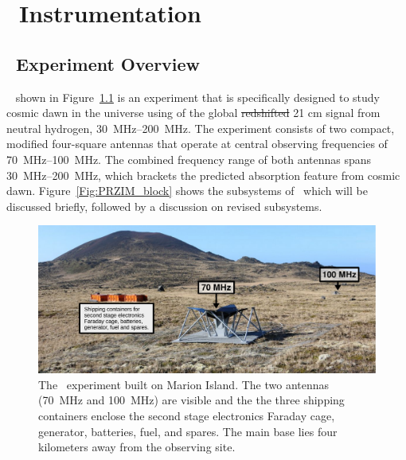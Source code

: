 \chapter{\prizm~Instrumentation}
\section{\prizm~Experiment Overview}

\prizm~\citep[\st{\prizm;}][]{2019JAI.....850004P} shown in Figure~\ref{Fig:prizm} is an experiment that is specifically designed to study cosmic dawn in the universe using  of the global \st{redshifted} 21 cm signal from neutral hydrogen,  \SIrange{30}{200}{\mega \hertz}. The experiment consists of two compact, modified four-square antennas  that operate at central observing frequencies of \SIrange{70}{100}{\mega \hertz}. The combined frequency range of both antennas spans \SIrange{30}{200}{\mega \hertz}, which brackets the predicted absorption feature from cosmic dawn. Figure~\ref{Fig:PRZIM_block} shows the subsystems of \prizm\, which will be discussed briefly, followed by a discussion on revised subsystems. 

\begin{figure}
	\centering
	\includegraphics[width=\linewidth]{Figures/prizm.pdf}
	\caption{The \prizm\ experiment built on Marion Island. The two antennas (\SI{70}{\mega \hertz} and \SI{100}{\mega \hertz}) are visible and the the three shipping containers enclose the second stage electronics Faraday cage, generator, batteries, fuel, and spares. The main base lies four kilometers away from the observing site.}
	\label{Fig:prizm}
\end{figure}

